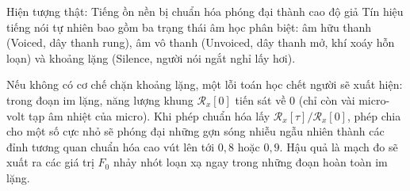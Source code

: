 \begin{firstprin}{Hiện tượng thật: Tiếng ồn nền bị chuẩn hóa phóng đại thành cao độ giả}
Tín hiệu tiếng nói tự nhiên bao gồm ba trạng thái âm học phân biệt: âm hữu thanh (Voiced, dây thanh rung), âm vô thanh (Unvoiced, dây thanh mở, khí xoáy hỗn loạn) và khoảng lặng (Silence, người nói ngắt nghỉ lấy hơi).

Nếu không có cơ chế chặn khoảng lặng, một lỗi toán học chết người sẽ xuất hiện: trong đoạn im lặng, năng lượng khung $\mathcal{R}_x[0]$ tiến sát về 0 (chỉ còn vài micro-volt tạp âm nhiệt của micro). Khi phép chuẩn hóa lấy $\mathcal{R}_x[\tau] / \mathcal{R}_x[0]$, phép chia cho một số cực nhỏ sẽ phóng đại những gợn sóng nhiễu ngẫu nhiên thành các đỉnh tương quan chuẩn hóa cao vút lên tới $0{,}8$ hoặc $0{,}9$. Hậu quả là mạch đo sẽ xuất ra các giá trị $F_0$ nhảy nhót loạn xạ ngay trong những đoạn hoàn toàn im lặng.
\end{firstprin}

